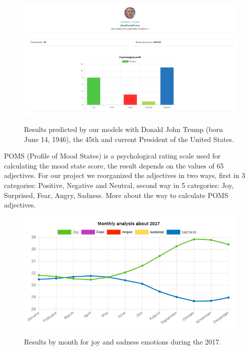 \documentclass{acmtog} %
\begin{document}
\begin{figure}[h!]
{\includegraphics[width=\linewidth]{Trump-results-analysis_exemple.png}}
\caption{Results predicted by our models with Donald John Trump (born June 14, 1946), the 45th and current President of the United States.}
  \label{fig:trump_results}
\end{figure}

POMS (Profile of Mood States) is a psychological rating scale used for calculating the mood state score, the result depends on the values of 65 adjectives. For our project we reorganized the adjectives in two ways, first in 3 categories: Positive, Negative and Neutral, second way in 5 categories: Joy, Surprised, Fear, Angry, Sadness. More about the way to calculate POMS adjectives.


\begin{figure}[h!]
{\includegraphics[width=\linewidth]{monthly_analysis_joy_sadness-exemple.png}}
\caption{Results by month for joy and sadness emotions during the 2017.}
  \label{fig:trump_results}
\end{figure}
\end{document}
